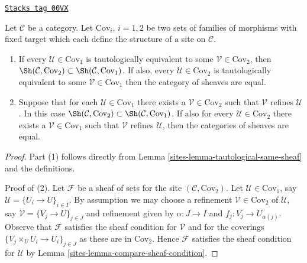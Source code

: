 \begin{lemma}
\label{sites-lemma-refine-same-topology}
\href{https://stacks.math.columbia.edu/tag/00VX}{\texttt{Stacks tag 00VX}}

Let $\mathcal{C}$ be a category. Let $\text{Cov}_i$, $i = 1, 2$
be two sets of families of morphisms with fixed target which
each define the structure of a site on $\mathcal{C}$.
\begin{enumerate}
\item If every $\mathcal{U} \in \text{Cov}_1$ is tautologically
equivalent to some $\mathcal{V} \in \text{Cov}_2$, then
$\Sh(\mathcal{C}, \text{Cov}_2) \subset
\Sh(\mathcal{C}, \text{Cov}_1)$.
If also, every $\mathcal{U} \in \text{Cov}_2$ is tautologically
equivalent to some $\mathcal{V} \in \text{Cov}_1$ then
the category of sheaves are equal.
\item Suppose
that for each $\mathcal{U} \in \text{Cov}_1$ there exists a
$\mathcal{V} \in \text{Cov}_2$ such that $\mathcal{V}$ refines
$\mathcal{U}$. In this case
$\Sh(\mathcal{C}, \text{Cov}_2) \subset
\Sh(\mathcal{C}, \text{Cov}_1)$.
If also for every $\mathcal{U} \in \text{Cov}_2$
there exists a $\mathcal{V} \in \text{Cov}_1$ such that $\mathcal{V}$
refines $\mathcal{U}$, then the categories of sheaves
are equal.
\end{enumerate}
\end{lemma}

\begin{proof}

Part (1) follows directly from Lemma \ref{sites-lemma-tautological-same-sheaf}
and the definitions.

\medskip\noindent
Proof of (2). Let $\mathcal{F}$ be a sheaf of sets for the site
$(\mathcal{C}, \text{Cov}_2)$. Let $\mathcal{U} \in \text{Cov}_1$,
say $\mathcal{U} = \{U_i \to U\}_{i \in I}$. By assumption we may choose a
refinement $\mathcal{V} \in \text{Cov}_2$ of $\mathcal{U}$, say
$\mathcal{V} = \{V_j \to U\}_{j \in J}$ and refinement given
by $\alpha : J \to I$ and $f_j : V_j \to U_{\alpha(j)}$.
Observe that $\mathcal{F}$ satisfies the sheaf condition for
$\mathcal{V}$ and for the coverings $\{V_j \times_U U_i \to U_i\}_{j \in J}$
as these are in $\text{Cov}_2$. Hence $\mathcal{F}$ satisfies
the sheaf condition for $\mathcal{U}$ by
Lemma \ref{sites-lemma-compare-sheaf-condition}.
\end{proof}

